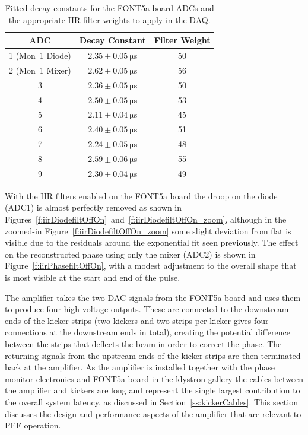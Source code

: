 \begin{table}
  \begin{center}
    \begin{tabular}{| c c c |}
	   \hline
       ADC & Decay Constant & Filter Weight \\ \hline
       1 (Mon~1 Diode) & \(2.35\pm0.05~\mathrm{\mu}\)s & 50 \\
	   2 (Mon~1 Mixer) & \(2.62\pm0.05~\mathrm{\mu}\)s & 56 \\
	   3 & \(2.36\pm0.05~\mathrm{\mu}\)s & 50 \\
	   4 & \(2.50\pm0.05~\mathrm{\mu}\)s & 53 \\
	   5 & \(2.11\pm0.04~\mathrm{\mu}\)s & 45 \\
	   6 & \(2.40\pm0.05~\mathrm{\mu}\)s & 51 \\
	   7 & \(2.24\pm0.05~\mathrm{\mu}\)s & 48 \\
	   8 & \(2.59\pm0.06~\mathrm{\mu}\)s & 55 \\
	   9 & \(2.30\pm0.04~\mathrm{\mu}\)s & 49 \\
 	   \hline
    \end{tabular}
    \caption{Fitted decay constants for the FONT5a board ADCs and the appropriate IIR filter weights to apply in the DAQ.}
  	\label{t:filtWeights}
  \end{center}
\end{table}

With the IIR filters enabled on the FONT5a board the droop on the diode (ADC1) is almost perfectly removed as shown in Figures~\ref{f:iirDiodefiltOffOn}~and~\ref{f:iirDiodefiltOffOn_zoom}, although in the zoomed-in Figure~\ref{f:iirDiodefiltOffOn_zoom} some slight deviation from flat is visible due to the residuals around the exponential fit seen previously. The effect on the reconstructed phase using only the mixer (ADC2) is shown in Figure~\ref{f:iirPhasefiltOffOn}, with a modest adjustment to the overall shape that is most visible at the start and end of the pulse.


The amplifier takes the two DAC signals from the FONT5a board and
uses them to produce four high voltage outputs. These are connected to the downstream ends of the kicker strips (two kickers and two strips per kicker gives four connections at the downstream ends in total), creating the potential difference between the strips that deflects the beam in order to correct the phase. The returning signals from the upstream ends of the kicker strips are then terminated back at the amplifier. As the amplifier is installed together with the phase monitor electronics and FONT5a board in the klystron gallery the cables between the amplifier and kickers are long and represent the single largest contribution to the overall system latency, as discussed in Section~\ref{ss:kickerCables}. This section discusses the design and performance aspects of the amplifier that are relevant to PFF operation.


